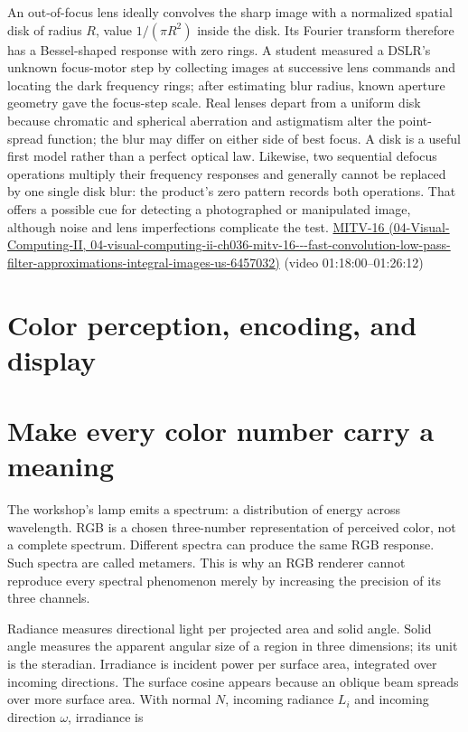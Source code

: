 An out-of-focus lens ideally convolves the sharp image with a normalized spatial disk of radius \(R\), value \(1/(\pi R^2)\) inside the disk. Its Fourier transform therefore has a Bessel-shaped response with zero rings. A student measured a DSLR's unknown focus-motor step by collecting images at successive lens commands and locating the dark frequency rings; after estimating blur radius, known aperture geometry gave the focus-step scale. Real lenses depart from a uniform disk because chromatic and spherical aberration and astigmatism alter the point-spread function; the blur may differ on either side of best focus. A disk is a useful first model rather than a perfect optical law. Likewise, two sequential defocus operations multiply their frequency responses and generally cannot be replaced by one single disk blur: the product's zero pattern records both operations. That offers a possible cue for detecting a photographed or manipulated image, although noise and lens imperfections complicate the test. \href{../04-Visual-Computing-II/main.pdf\#nameddest=04-visual-computing-ii-ch036-mitv-16---fast-convolution-low-pass-filter-approximations-integral-images-us-6457032}{MITV-16 (04-Visual-Computing-II, 04-visual-computing-ii-ch036-mitv-16-\/-\/-fast-convolution-low-pass-filter-approximations-integral-images-us-6457032)} (video 01:18:00--01:26:12)

\section{Color perception, encoding, and display}\label{03-visual-computing-i-ch004-color-perception-encoding-and-display}

\section{Make every color number carry a meaning}\label{03-visual-computing-i-ch004-make-every-color-number-carry-a-meaning}

The workshop's lamp emits a spectrum: a distribution of energy across wavelength. RGB is a chosen three-number representation of perceived color, not a complete spectrum. Different spectra can produce the same RGB response. Such spectra are called metamers. This is why an RGB renderer cannot reproduce every spectral phenomenon merely by increasing the precision of its three channels.

Radiance measures directional light per projected area and solid angle. Solid angle measures the apparent angular size of a region in three dimensions; its unit is the steradian. Irradiance is incident power per surface area, integrated over incoming directions. The surface cosine appears because an oblique beam spreads over more surface area. With normal \(N\), incoming radiance \(L_i\) and incoming direction \(\omega\), irradiance is


